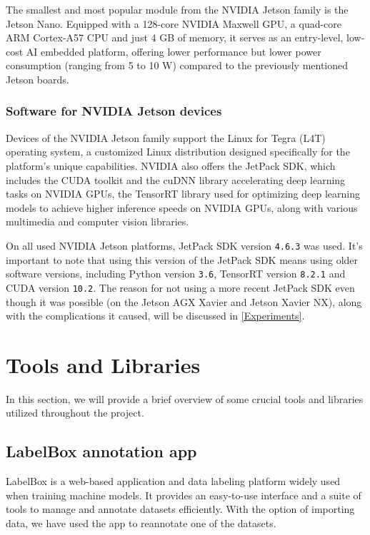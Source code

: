 The smallest and most popular module from the NVIDIA Jetson family is the Jetson
Nano. Equipped with a 128-core NVIDIA Maxwell GPU, a quad-core ARM Cortex-A57
CPU and just 4 GB of memory, it serves as an entry-level, low-cost AI embedded
platform, offering lower performance but lower power consumption (ranging from 5
to 10 W) compared to the previously mentioned Jetson boards.


\subsubsection{Software for NVIDIA Jetson devices}

Devices of the NVIDIA Jetson family support the Linux for Tegra (L4T) operating
system, a customized Linux distribution designed specifically for the platform's
unique capabilities. NVIDIA also offers the JetPack SDK, which includes the
CUDA toolkit and the cuDNN library accelerating deep learning tasks on NVIDIA
GPUs, the TensorRT library used for optimizing deep learning models to achieve
higher inference speeds on NVIDIA GPUs, along with various multimedia and
computer vision libraries.

On all used NVIDIA Jetson platforms, JetPack SDK version \texttt{4.6.3} was
used. It's important to note that using this version of the JetPack SDK means
using older software versions, including Python version \texttt{3.6}, TensorRT
version \texttt{8.2.1} and CUDA version \texttt{10.2}. The reason for not using
a more recent JetPack SDK even though it was possible (on the Jetson AGX Xavier
and Jetson Xavier NX), along with the complications it caused, will be discussed
in \autoref{Experiments}.


\section{Tools and Libraries}

In this section, we will provide a brief overview of some crucial tools and
libraries utilized throughout the project.


\subsection{LabelBox annotation app}

LabelBox \cite{LabelBox} is a web-based application and data labeling platform
widely used when training machine models. It provides an easy-to-use interface
and a suite of tools to manage and annotate datasets efficiently. With the
option of importing data, we have used the app to reannotate one of the
datasets.


